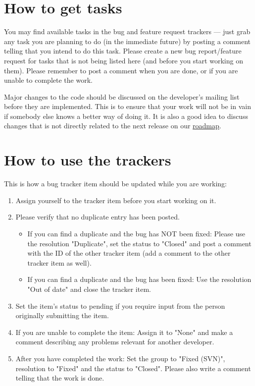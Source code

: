 \documentclass[12pt]{book}
\begin{document}
\hypertarget{How to get tasks}{\section{How to get tasks}}

You may find available tasks in the bug and feature request
trackers --- just grab any task you are planning to do (in the
immediate future) by posting a comment telling that you intend
to do this task. Please create a new bug report/feature request
for tasks that is not being listed here (and before you start
working on them). Please remember to post a comment when
you are done, or if you are unable to complete the work.

Major changes to the code should be discussed on the
developer's mailing list before they are implemented. This is to
ensure that your work will not be in vain if somebody else knows
a better way of doing it. It is also a good idea to discuss changes
that is not directly related to the next release on our
\href{http://www.freecol.org/index.php?section=18}{roadmap}.


\hypertarget{How to use the trackers}{\section{How to use the trackers}}

This is how a bug tracker item should be updated while you are working:

\begin{enumerate}
\item Assign yourself to the tracker item before you start working on it.

\item Please verify that no duplicate entry has been posted.

\begin{itemize}
\item If you can find a duplicate and the bug has NOT been fixed:
  Please use the resolution "Duplicate", set the status to "Closed"
  and post a comment with the ID of the other tracker item (add a
  comment to the other tracker item as well).

\item If you can find a duplicate and the bug has been fixed: Use the
  resolution "Out of date" and close the tracker item.
\end{itemize}

\item Set the item's status to pending if you require input from the person
   originally submitting the item.

\item If you are unable to complete the item: Assign it to "None" and
   make a comment describing any problems relevant for another developer.

\item After you have completed the work: Set the group to "Fixed (SVN)",
   resolution to "Fixed" and the status to "Closed". Please also write
   a comment telling that the work is done.
\end{enumerate}
\end{document}
